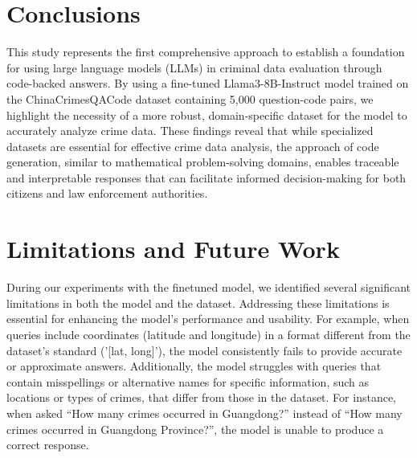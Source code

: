 
\section{Conclusions}



This study represents the first comprehensive approach to establish a foundation for using large language models (LLMs) in criminal data evaluation through code-backed answers. By using a fine-tuned Llama3-8B-Instruct model trained on the ChinaCrimesQACode dataset containing 5,000 question-code pairs, we highlight the necessity of a more robust, domain-specific dataset for the model to accurately analyze crime data. These findings reveal that while specialized datasets are essential for effective crime data analysis, the approach of code generation, similar to mathematical problem-solving domains, enables traceable and interpretable responses that can facilitate informed decision-making for both citizens and law enforcement authorities.



\section{Limitations and Future Work}

During our experiments with the finetuned model, we identified several significant limitations in both the model and the dataset. Addressing these limitations is essential for enhancing the model's performance and usability. For example, when queries include coordinates (latitude and longitude) in a format different from the dataset's standard ('[lat, long]'), the model consistently fails to provide accurate or approximate answers. Additionally, the model struggles with queries that contain misspellings or alternative names for specific information, such as locations or types of crimes, that differ from those in the dataset. For instance, when asked ``How many crimes occurred in Guangdong?'' instead of ``How many crimes occurred in Guangdong Province?'', the model is unable to produce a correct response.

